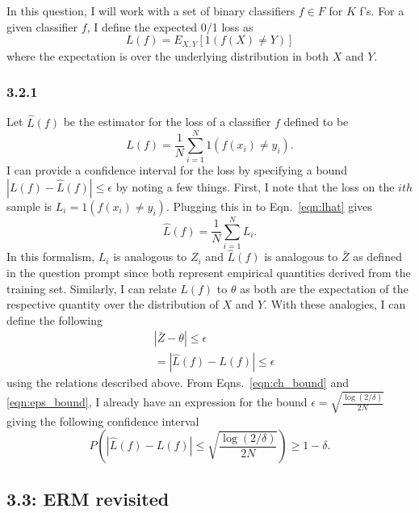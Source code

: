 \documentclass[12pt]{amsart}
\begin{document}
In this question, I will work with a set of binary classifiers $f \in F$ for $K$ f's.  For a given classifier $f$, I define the expected 0/1 loss as
\begin{equation} \label{eqn:loss_01}
L(f) = E_{X,Y}[1(f(X) \neq Y)]
\end{equation}
where the expectation is over the underlying distribution in both $X$ and $Y$.

\subsubsection*{3.2.1}

Let $\hat{L}(f)$ be the estimator for the loss of a classifier $f$ defined to be
\begin{equation} \label{eqn:lhat}
\hat{L}(f) = \frac{1}{N} \sum_{i = 1}^N 1(f(x_i) \neq y_i).
\end{equation}
I can provide a confidence interval for the loss by specifying a bound $|L(f) - \hat{L}(f)| \leq \epsilon$ by noting a few things.  First, I note that the loss on the $ith$ sample is $L_i = 1(f(x_i) \neq y_i)$.  Plugging this in to Eqn.~\ref{eqn:lhat} gives
\begin{equation}
\hat{L}(f) = \frac{1}{N} \sum_{i = 1}^N L_i.
\end{equation}
In this formalism, $L_i$ is analogous to $Z_i$ and $\hat{L}(f)$ is analogous to $\bar{Z}$ as defined in the question prompt since both represent empirical quantities derived from the training set.  Similarly, I can relate $L(f)$ to $\theta$ as both are the expectation of the respective quantity over the distribution of $X$ and $Y$.  With these analogies, I can define the following
\begin{equation}
\begin{split}
& |\bar{Z} - \theta | \leq \epsilon \\
& = |\hat{L}(f) - L(f) | \leq \epsilon
\end{split}
\end{equation}
using the relations described above.  From Eqns.~\ref{eqn:ch_bound} and \ref{eqn:eps_bound}, I already have an expression for the bound $\epsilon = \sqrt{\frac{\log(2/\delta)}{2N}}$ giving the following confidence interval
\begin{equation}
P(|\hat{L}(f) - L(f)| \leq \sqrt{\frac{\log(2/\delta)}{2N}}) \geq 1 - \delta.
\end{equation}

\subsection*{3.3: ERM revisited}
\end{document}
